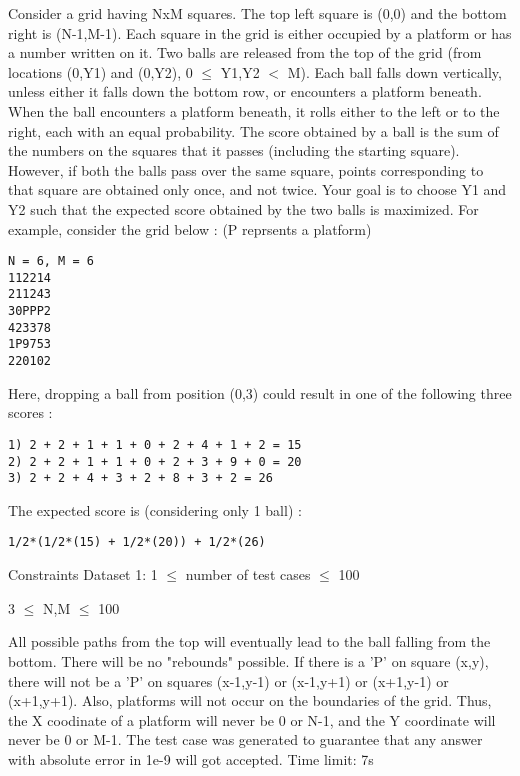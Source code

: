 Consider a grid having NxM squares. The top left square is (0,0) and the bottom right is (N-1,M-1). Each square in the grid is either occupied by a platform or has a number written on it. Two balls are released from the top of the grid (from locations (0,Y1) and (0,Y2), 0  $\le$  Y1,Y2 $<$ M). Each ball falls down vertically, unless either it falls down the bottom row, or encounters a platform beneath. When the ball encounters a platform beneath, it rolls either to the left or to the right, each with an equal probability. The score obtained by a ball is the sum of the numbers on the squares that it passes (including the starting square). However, if both the balls pass over the same square, points corresponding to that square are obtained only once, and not twice. Your goal is to choose Y1 and Y2 such that the expected score obtained by the two balls is maximized. For example, consider the grid below : (P reprsents a platform)  
\begin{verbatim}
N = 6, M = 6
112214
211243
30PPP2
423378
1P9753
220102
\end{verbatim}

   Here, dropping a ball from position (0,3) could result in one of the following three scores :  
\begin{verbatim}
1) 2 + 2 + 1 + 1 + 0 + 2 + 4 + 1 + 2 = 15 
2) 2 + 2 + 1 + 1 + 0 + 2 + 3 + 9 + 0 = 20
3) 2 + 2 + 4 + 3 + 2 + 8 + 3 + 2 = 26
\end{verbatim}

   The expected score is (considering only 1 ball) :  
\begin{verbatim}
1/2*(1/2*(15) + 1/2*(20)) + 1/2*(26)\end{verbatim}

Constraints
Dataset 1: 1  $\le$  number of test cases  $\le$  100  

   3  $\le$  N,M  $\le$  100  

   All possible paths from the top will eventually lead to the ball falling from the bottom. There will be no "rebounds" possible. If there is a 'P' on square (x,y), there will not be a 'P' on squares (x-1,y-1) or (x-1,y+1) or (x+1,y-1) or (x+1,y+1). Also, platforms will not occur on the boundaries of the grid. Thus, the X coodinate of a platform will never be 0 or N-1, and the Y coordinate will never be 0 or M-1. The test case was generated to guarantee that any answer with absolute error in 1e-9 will got accepted. Time limit: 7s